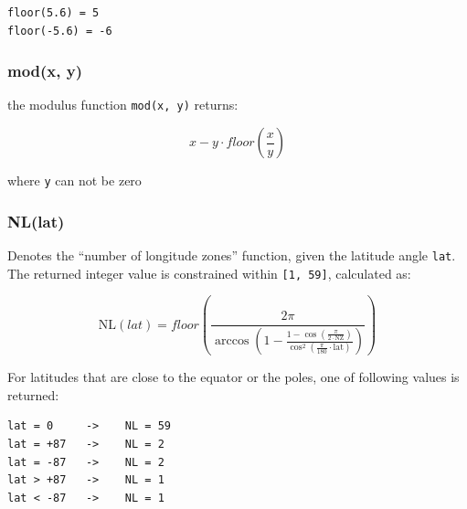 \begin{verbatim}
floor(5.6) = 5
floor(-5.6) = -6
\end{verbatim}

\subsubsection{mod(x, y)}\label{modx-y}

the modulus function \texttt{mod(x,\ y)} returns:

\begin{equation}
  x - y \cdot floor(\frac{x}{y})
\end{equation}

where \texttt{y} can not be zero

\subsubsection{NL(lat)}\label{nllat}

Denotes the ``number of longitude zones'' function, given the latitude angle \texttt{lat}. The returned integer value is constrained within \texttt{{[}1,\ 59{]}}, calculated as:

\begin{equation}
  \text{NL}(lat) = floor \left( \frac{2 \pi}{\arccos(1 - \frac{1-\cos(\frac{\pi}{2 \cdot \text{NZ}})}{\cos^2(\frac{\pi}{180} \cdot \text{lat})}) } \right)
\end{equation}

For latitudes that are close to the equator or the poles, one of following values is returned:

\begin{verbatim}
lat = 0     ->    NL = 59
lat = +87   ->    NL = 2
lat = -87   ->    NL = 2
lat > +87   ->    NL = 1
lat < -87   ->    NL = 1
\end{verbatim}
